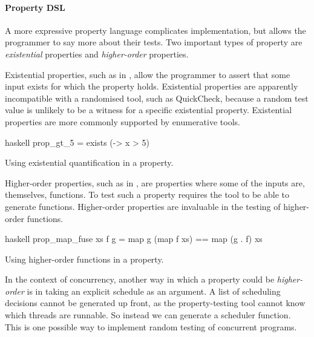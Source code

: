 \paragraph{Property DSL}
A more expressive property language complicates implementation, but
allows the programmer to say more about their tests.  Two important
types of property are \emph{existential} properties and
\emph{higher-order} properties.

Existential properties, such as in , allow the
programmer to assert that some input exists for which the property
holds.  Existential properties are apparently incompatible with a
randomised tool, such as QuickCheck, because a random test value is
unlikely to be a witness for a specific existential property.
Existential properties are more commonly supported by enumerative
tools.

\begin{listing}
\centering
\begin{cminted}{haskell}
prop_gt_5 = exists (\x -> x > 5)
\end{cminted}
\caption{Using existential quantification in a property.}\label{lst:prop_gt_5}
\end{listing}

Higher-order properties, such as in , are
properties where some of the inputs are, themselves, functions.  To
test such a property requires the tool to be able to generate
functions.  Higher-order properties are invaluable in the testing of
higher-order functions.

\begin{listing}
\centering
\begin{cminted}{haskell}
prop_map_fuse xs f g = map g (map f xs) == map (g . f) xs
\end{cminted}
\caption{Using higher-order functions in a property.}\label{lst:prop_map_fuse}
\end{listing}

In the context of concurrency, another way in which a property could
be \emph{higher-order} is in taking an explicit schedule as an
argument.  A list of scheduling decisions cannot be generated up
front, as the property-testing tool cannot know which threads are
runnable.  So instead we can generate a scheduler
function\cite{ankuzik2014}.  This is one possible way to implement
random testing of concurrent programs.

